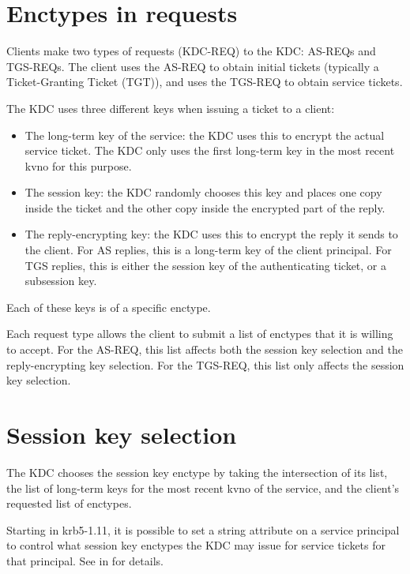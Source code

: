 \documentclass[letterpaper,10pt,english]{sphinxmanual}
\begin{document}
\section{Enctypes in requests}
\label{\detokenize{admin/enctypes:enctypes-in-requests}}
Clients make two types of requests (KDC-REQ) to the KDC: AS-REQs and
TGS-REQs.  The client uses the AS-REQ to obtain initial tickets
(typically a Ticket-Granting Ticket (TGT)), and uses the TGS-REQ to
obtain service tickets.

The KDC uses three different keys when issuing a ticket to a client:
\begin{itemize}
\item {} 
The long-term key of the service: the KDC uses this to encrypt the
actual service ticket.  The KDC only uses the first long-term key in
the most recent kvno for this purpose.

\item {} 
The session key: the KDC randomly chooses this key and places one
copy inside the ticket and the other copy inside the encrypted part
of the reply.

\item {} 
The reply-encrypting key: the KDC uses this to encrypt the reply it
sends to the client.  For AS replies, this is a long-term key of the
client principal.  For TGS replies, this is either the session key of the
authenticating ticket, or a subsession key.

\end{itemize}

Each of these keys is of a specific enctype.

Each request type allows the client to submit a list of enctypes that
it is willing to accept.  For the AS-REQ, this list affects both the
session key selection and the reply-encrypting key selection.  For the
TGS-REQ, this list only affects the session key selection.


\section{Session key selection}
\label{\detokenize{admin/enctypes:session-key-selection}}\label{\detokenize{admin/enctypes:id1}}
The KDC chooses the session key enctype by taking the intersection of
its  list, the list of long-term keys for the
most recent kvno of the service, and the client’s requested list of
enctypes.

Starting in krb5-1.11, it is possible to set a string attribute on a
service principal to control what session key enctypes the KDC may
issue for service tickets for that principal.  See {\hyperref[\detokenize{admin/admin_commands/kadmin_local:set-string}]{}}
in {\hyperref[\detokenize{admin/admin_commands/kadmin_local:kadmin-1}]{}} for details.
\end{document}
